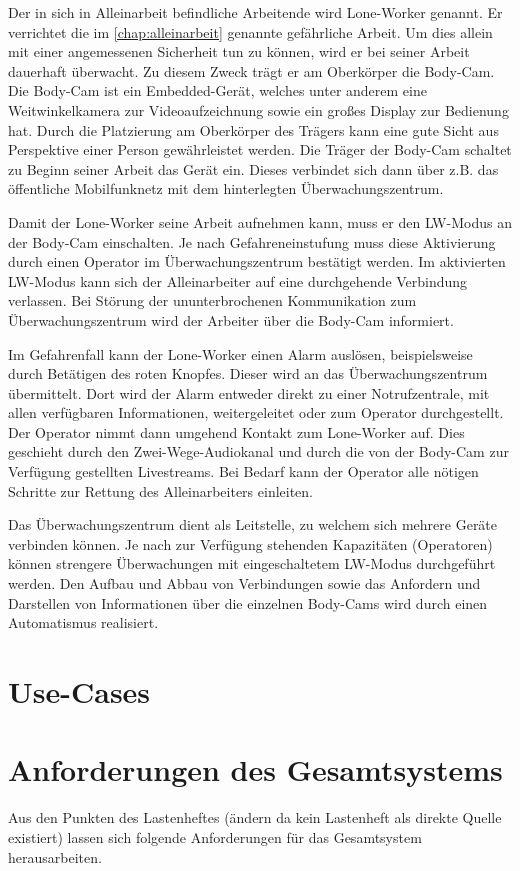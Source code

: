 \documentclass[thesis.tex]{subfiles}
\begin{document}
Der in sich in Alleinarbeit befindliche Arbeitende wird Lone-Worker genannt.
Er verrichtet die im \autoref{chap:alleinarbeit} genannte gefährliche Arbeit.
Um dies allein mit einer angemessenen Sicherheit tun zu können, wird er bei seiner Arbeit dauerhaft überwacht.
Zu diesem Zweck trägt er am Oberkörper die Body-Cam.
Die Body-Cam ist ein Embedded-Gerät, welches unter anderem eine Weitwinkelkamera zur Videoaufzeichnung sowie ein großes Display zur Bedienung hat.
Durch die Platzierung am Oberkörper des Trägers kann eine gute Sicht aus Perspektive einer Person gewährleistet werden.
Die Träger der Body-Cam schaltet zu Beginn seiner Arbeit das Gerät ein.
Dieses verbindet sich dann über z.B. das öffentliche Mobilfunknetz mit dem hinterlegten Überwachungszentrum.

Damit der Lone-Worker seine Arbeit aufnehmen kann, muss er den LW-Modus an der Body-Cam einschalten.
Je nach Gefahreneinstufung muss diese Aktivierung durch einen Operator im Überwachungszentrum bestätigt werden.
Im aktivierten LW-Modus kann sich der Alleinarbeiter auf eine durchgehende Verbindung verlassen.
Bei Störung der ununterbrochenen Kommunikation zum Überwachungszentrum wird der Arbeiter über die Body-Cam informiert.

Im Gefahrenfall kann der Lone-Worker einen Alarm auslösen, beispielsweise durch Betätigen des roten Knopfes.
Dieser wird an das Überwachungszentrum übermittelt.
Dort wird der Alarm entweder direkt zu einer Notrufzentrale, mit allen verfügbaren Informationen, weitergeleitet oder zum Operator durchgestellt.
Der Operator nimmt dann umgehend Kontakt zum Lone-Worker auf.
Dies geschieht durch den Zwei-Wege-Audiokanal und durch die von der Body-Cam zur Verfügung gestellten Livestreams.
Bei Bedarf kann der Operator alle nötigen Schritte zur Rettung des Alleinarbeiters einleiten.

Das Überwachungszentrum dient als Leitstelle, zu welchem sich mehrere Geräte verbinden können.
Je nach zur Verfügung stehenden Kapazitäten (Operatoren) können strengere Überwachungen mit eingeschaltetem LW-Modus durchgeführt werden.
Den Aufbau und Abbau von Verbindungen sowie das Anfordern und Darstellen von Informationen über die einzelnen Body-Cams wird
durch einen Automatismus realisiert.

\section{Use-Cases}
\section{Anforderungen des Gesamtsystems}
Aus den Punkten des Lastenheftes (ändern da kein Lastenheft als direkte Quelle existiert) lassen sich folgende Anforderungen für das Gesamtsystem herausarbeiten.
\end{document}
